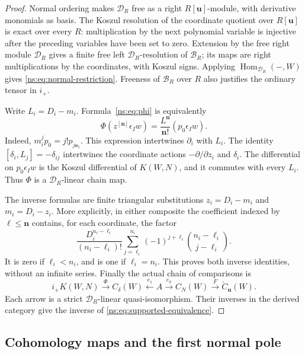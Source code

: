 \begin{proof}
Normal ordering makes \(\mathcal D_R\) free as a right
\(R[\boldsymbol u]\)-module, with derivative monomials as basis.
The Koszul resolution of the coordinate quotient over
\(R[\boldsymbol u]\) is exact over every \(R\): multiplication
by the next polynomial variable is injective after the preceding
variables have been set to zero.  Extension by the free right
module \(\mathcal D_R\) gives a finite free left
\(\mathcal D_R\)-resolution of \(\mathcal B_R\); its maps are
right multiplications by the coordinates, with Koszul signs.
Applying \(\operatorname{Hom}_{\mathcal D_R}(-,W)\) gives
\eqref{ns:eq:normal-restriction}.  Freeness of \(\mathcal B_R\)
over \(R\) also justifies the ordinary tensor in \(i_+\).

Write \(L_i=D_i-m_i\).  Formula~\eqref{ns:eq:phi} is equivalently
\[
 \Phi(z^{[\boldsymbol n]}\epsilon_Iw)
       =\frac{L^{\boldsymbol n}}{\boldsymbol n!}(p_0\epsilon_Iw).
\]
Indeed, \(m_i^jp_0=j!p_{j\boldsymbol e_i}\).
This expression intertwines \(\partial_i\) with \(L_i\).
The identity \([\delta_i,L_j]=-\delta_{ij}\) intertwines the
coordinate actions \(-\partial/\partial z_i\) and \(\delta_i\).
The differential on \(p_0\epsilon_Iw\) is the Koszul differential
of \(K(W,N)\), and it commutes with every \(L_i\).
Thus \(\Phi\) is a \(\mathcal D_R\)-linear chain map.

The inverse formulas are finite triangular substitutions
\(z_i=D_i-m_i\) and \(m_i=D_i-z_i\).
More explicitly, in either composite the coefficient indexed by
\(\boldsymbol\ell\leq\boldsymbol n\) contains, for each coordinate,
the factor
\[
 \frac{D_i^{n_i-\ell_i}}{(n_i-\ell_i)!}
 \sum_{j=\ell_i}^{n_i}(-1)^{j+\ell_i}
          \binom{n_i-\ell_i}{j-\ell_i}.
\]
It is zero if \(\ell_i<n_i\), and is one if \(\ell_i=n_i\).
This proves both inverse identities, without an infinite series.
Finally the actual chain of comparisons is
\[
 i_+K(W,N)\xrightarrow{\ \Phi\ }C_\delta(W)
     \xleftarrow{\ e_1\ }A
     \xrightarrow{\ e_0\ }C_N(W)
     \xrightarrow{\ F\ }\check C_{\boldsymbol u}(W).
\]
Each arrow is a strict \(\mathcal D_R\)-linear quasi-isomorphism.
Their inverses in the derived category give the inverse of
\eqref{ns:eq:supported-equivalence}.
\end{proof}

\subsection{Cohomology maps and the first normal pole}

